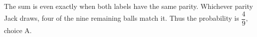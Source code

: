 The sum is even exactly when both labels have the same parity. Whichever parity Jack draws, four of the nine remaining balls match it. Thus the probability is $\boxed{\dfrac{4}{9}}$, choice A.
